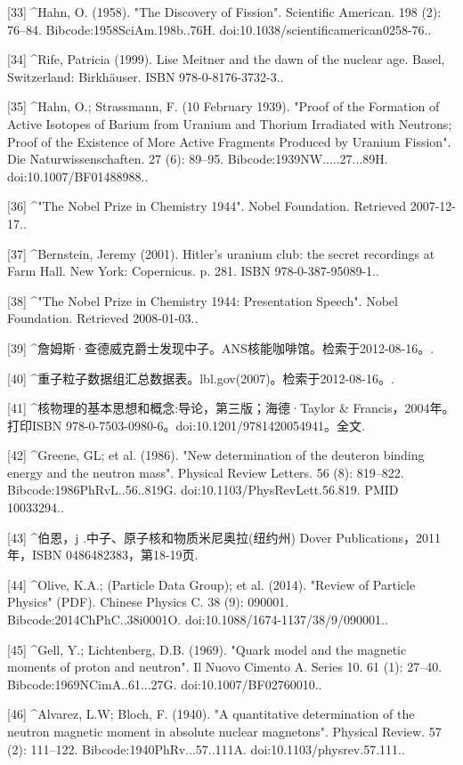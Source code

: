 [33]
^Hahn, O. (1958). "The Discovery of Fission". Scientific American. 198 (2): 76–84. Bibcode:1958SciAm.198b..76H. doi:10.1038/scientificamerican0258-76..

[34]
^Rife, Patricia (1999). Lise Meitner and the dawn of the nuclear age. Basel, Switzerland: Birkhäuser. ISBN 978-0-8176-3732-3..

[35]
^Hahn, O.; Strassmann, F. (10 February 1939). "Proof of the Formation of Active Isotopes of Barium from Uranium and Thorium Irradiated with Neutrons; Proof of the Existence of More Active Fragments Produced by Uranium Fission". Die Naturwissenschaften. 27 (6): 89–95. Bibcode:1939NW.....27...89H. doi:10.1007/BF01488988..

[36]
^"The Nobel Prize in Chemistry 1944". Nobel Foundation. Retrieved 2007-12-17..

[37]
^Bernstein, Jeremy (2001). Hitler's uranium club: the secret recordings at Farm Hall. New York: Copernicus. p. 281. ISBN 978-0-387-95089-1..

[38]
^"The Nobel Prize in Chemistry 1944: Presentation Speech". Nobel Foundation. Retrieved 2008-01-03..

[39]
^詹姆斯·查德威克爵士发现中子。ANS核能咖啡馆。检索于2012-08-16。.

[40]
^重子粒子数据组汇总数据表。lbl.gov(2007)。检索于2012-08-16。.

[41]
^核物理的基本思想和概念:导论，第三版；海德·Taylor & Francis，2004年。打印ISBN 978-0-7503-0980-6。doi:10.1201/9781420054941。全文.

[42]
^Greene, GL; et al. (1986). "New determination of the deuteron binding energy and the neutron mass". Physical Review Letters. 56 (8): 819–822. Bibcode:1986PhRvL..56..819G. doi:10.1103/PhysRevLett.56.819. PMID 10033294..

[43]
^伯恩，j .中子、原子核和物质米尼奥拉(纽约州) Dover Publications，2011年，ISBN 0486482383，第18-19页.

[44]
^Olive, K.A.; (Particle Data Group); et al. (2014). "Review of Particle Physics" (PDF). Chinese Physics C. 38 (9): 090001. Bibcode:2014ChPhC..38i0001O. doi:10.1088/1674-1137/38/9/090001..

[45]
^Gell, Y.; Lichtenberg, D.B. (1969). "Quark model and the magnetic moments of proton and neutron". Il Nuovo Cimento A. Series 10. 61 (1): 27–40. Bibcode:1969NCimA..61...27G. doi:10.1007/BF02760010..

[46]
^Alvarez, L.W; Bloch, F. (1940). "A quantitative determination of the neutron magnetic moment in absolute nuclear magnetons". Physical Review. 57 (2): 111–122. Bibcode:1940PhRv...57..111A. doi:10.1103/physrev.57.111..

